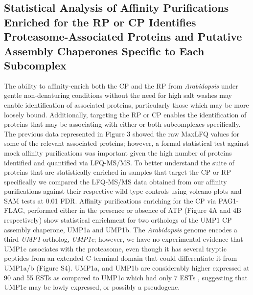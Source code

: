 \subsection{Statistical Analysis of Affinity Purifications Enriched for the RP or CP Identifies Proteasome-Associated Proteins and Putative Assembly Chaperones Specific to Each Subcomplex}
	The ability to affinity-enrich both the CP and the RP from \textit{Arabidopsis} under gentle non-denaturing conditions without the need for high salt washes may enable identification of associated proteins, particularly those which may be more loosely bound. Additionally, targeting the RP or CP enables the identification of proteins that may be associating with either or both subcomplexes specifically. The previous data represented in Figure 3 showed the raw MaxLFQ values for some of the relevant associated proteins; however, a formal statistical test against mock affinity purifications was important given the high number of proteins identified and quantified via LFQ-MS/MS. To better understand the suite of proteins that are statistically enriched in samples that target the CP or RP specifically we compared the LFQ-MS/MS data obtained from our affinity purifications against their respective wild-type controls using volcano plots and SAM tests at 0.01 FDR.
Affinity purifications enriching for the CP via PAG1-FLAG, performed either in the presence or absence of ATP (Figure 4A and 4B respectively) show statistical enrichment for two orthologs of the UMP1 CP assembly chaperone, UMP1a and UMP1b. The \textit{Arabidopsis} genome encodes a third \textit{UMP1} ortholog, \textit{UMP1c}; however, we have no experimental evidence that UMP1c associates with the proteasome, even though it has several tryptic peptides from an extended C-terminal domain that could differentiate it from UMP1a/b (Figure S4). UMP1a, and UMP1b are considerably higher expressed at 90 and 55 ESTs as compared to UMP1c which had only 7 ESTs \citep{berardini15}, suggesting that UMP1c may be lowly expressed, or possibly a pseudogene. 
